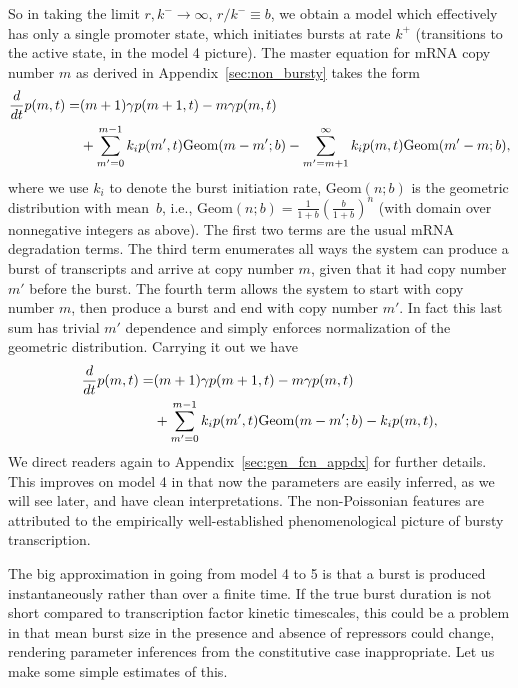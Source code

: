 So in taking the limit $r,k^-\rightarrow\infty$, $r/k^-\equiv b$, we obtain a
model which effectively has only a single promoter state, which initiates bursts
at rate $k^+$ (transitions to the active state, in the model 4 picture). The
master equation for mRNA copy number $m$ as derived in
Appendix~\ref{sec:non_bursty} takes the form
\begin{align}
\begin{split}
{d \over dt}p(m,t) = & (m+1)\gamma p(m+1,t) - m\gamma p(m,t) \\
        &+ \sum_{m'=0}^{m-1} k_i p(m',t) \text{Geom}(m-m';b)
         - \sum_{m'=m+1}^\infty k_i p(m,t) \text{Geom}(m'-m;b),
\end{split}
\end{align}
where we use $k_i$ to denote the burst initiation rate, $\text{Geom}(n;b)$ is the
geometric distribution with mean~$b$, i.e., $\text{Geom}(n;b) =
\frac{1}{1+b}\left(\frac{b}{1+b}\right)^n$ (with domain over nonnegative
integers as above). The first two terms are the usual mRNA degradation terms.
The third term enumerates all ways the system can produce a burst of transcripts
and arrive at copy number $m$, given that it had copy number $m'$ before the
burst. The fourth term allows the system to start with copy number $m$, then
produce a burst and end with copy number $m'$. In fact this last sum has trivial
$m'$ dependence and simply enforces normalization of the geometric distribution.
Carrying it out we have
\begin{equation}
\begin{split}
{d \over dt} p(m,t) = & (m+1)\gamma p(m+1,t) - m\gamma p(m,t) \\
        &+ \sum_{m'=0}^{m-1} k_i p(m',t) \text{Geom}(m-m';b)
            - k_i p(m,t),
\end{split}
\end{equation}
We direct readers again to Appendix~\ref{sec:gen_fcn_appdx} for further details.
This improves on model 4 in that now the parameters are easily inferred, as we
will see later, and have clean interpretations. The non-Poissonian features are
attributed to the empirically well-established phenomenological picture of
bursty transcription.

The big approximation in going from model 4 to 5 is that a burst is produced
instantaneously rather than over a finite time. If the true burst duration is
not short compared to transcription factor kinetic timescales, this could be a
problem in that mean burst size in the presence and absence of repressors could
change, rendering parameter inferences from the constitutive case inappropriate.
Let us make some simple estimates of this.

